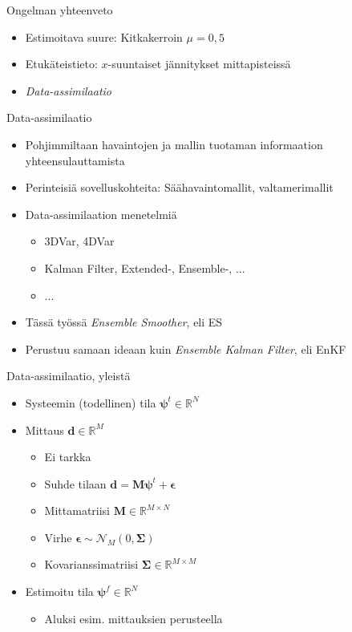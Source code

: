 \documentclass{beamer}
\begin{document}
\begin{frame}{Ongelman yhteenveto}

\begin{itemize}
\item Estimoitava suure: Kitkakerroin $\mu=0{,}5$
\item Etukäteistieto: $x$-suuntaiset jännitykset mittapisteissä
\item \emph{Data-assimilaatio}
\end{itemize}

\end{frame}

\begin{frame}{Data-assimilaatio}

\begin{itemize}
\item Pohjimmiltaan havaintojen ja mallin tuotaman informaation yhteensulauttamista
\item Perinteisiä sovelluskohteita: Säähavaintomallit, valtamerimallit
\item Data-assimilaation menetelmiä
\begin{itemize}
\item 3DVar, 4DVar
\item Kalman Filter, Extended-, Ensemble-, ...
\item ...
\end{itemize}
\item Tässä työssä \emph{Ensemble Smoother}, eli ES
\item Perustuu samaan ideaan kuin \emph{Ensemble Kalman Filter}, eli EnKF
\end{itemize}

\end{frame}

\begin{frame}{Data-assimilaatio, yleistä}

\begin{itemize}
\item Systeemin (todellinen) tila $\boldsymbol{\psi}^t \in \mathbb{R}^N$
\item Mittaus $\boldsymbol{d} \in \mathbb{R}^M$
\begin{itemize}
\item Ei tarkka
\item Suhde tilaan $\boldsymbol{d} = \mathbf{M}\boldsymbol{\psi}^t+\boldsymbol{\epsilon}$
\item Mittamatriisi $\mathbf{M} \in \mathbb{R}^{M \times N}$
\item Virhe $\boldsymbol{\epsilon} \sim \mathcal{N}_M(0,\boldsymbol{\Sigma})$
\item Kovarianssimatriisi $\boldsymbol{\Sigma} \in \mathbb{R}^{M \times M}$
\end{itemize}
\item Estimoitu tila $\boldsymbol{\psi}^f \in \mathbb{R}^N$
\begin{itemize}
\item Aluksi esim. mittauksien perusteella
\end{itemize}
\end{itemize}

\end{frame}
\end{document}
